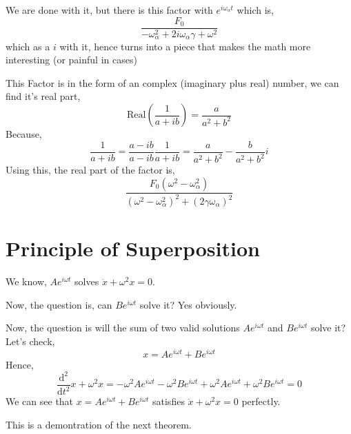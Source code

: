 \documentclass[11pt, a4paper]{memoir}
\begin{document}
We are done with it, but there is this factor with $e^{i \omega_{ \alpha} t}$ which is,
\[ 
\frac{F_0}{- \omega_{ \alpha}^2 + 2 i \omega_{ \alpha} \gamma + \omega^2} 
\]
which as a $i$ with it, hence turns into a piece that makes the math more interesting (or painful in cases)

This  Factor is in the form of an complex (imaginary plus real) number, we can find it's real part, 
\[ 
    \text{Real}\left( \frac{1}{a + ib} \right)  = \frac{a}{a^2 + b^2}
\]
Because,
\[ 
\frac{1}{a+ib} = \frac{a-ib}{a-ib} \frac{1}{a+ib} = \frac{a}{a^2 + b^2} - \frac{b}{a^2+b^2}i
\]
Using this, the real part of the factor is,
\[ 
    \frac{F_0 \left( \omega^2 - \omega_{ \alpha}^2 \right) }{\left( \omega^2 - \omega_{ \alpha}^2 \right)^2 + \left( 2 \gamma \omega_{ \alpha} \right)^2 }
\]













\section{Principle of Superposition}

We know, $A e^{ i \omega t}$ solves $ \ddot{x} + \omega^2 x = 0$. 


Now, the question is, can $B e^{i \omega t}$ solve it? Yes obviously. 

Now, the question is will the sum of two valid solutions $A e^{i \omega t}$ and $B e^{i \omega t}$ solve it? Let's check,
\[ 
x = Ae^{i \omega t} + B e^{i \omega t}
\] Hence,
\[ 
\frac{\mathrm{d} ^2}{\mathrm{d} t^2} x + \omega^2 x = 
-\omega^2 Ae^{i\omega t} - \omega^2 B e ^{i \omega t} + 
\omega^2 A e^{ i \omega t} + \omega^2 Be^{i \omega t } = 0
\]
We can see that $x = Ae^{i \omega t} + Be^{i \omega t}$ satisfies $ \ddot{ x} + \omega^2 x = 0$ perfectly. 

This is a demontration of the next theorem.

\end{document}
